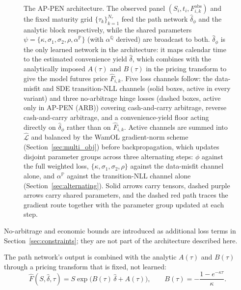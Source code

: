 \documentclass[11pt, a4paper]{article}
\begin{document}
\begin{figure}[h!]
{%
}
\caption{The AP-PEN architecture. The observed panel $(S_i, t_i, F^{\mathrm{obs}}_{i,k})$
and the fixed maturity grid $\{\tau_k\}_{k=1}^{N_\tau}$ feed the path network
$\hat{\delta}_\phi$ and the analytic block respectively, while the shared
parameters $\psi = \{\kappa, \sigma_1, \sigma_2, \rho, \alpha^{\mathbb{P}}\}$
(with $\alpha^{\mathbb{Q}}$ derived) are broadcast to both. $\hat{\delta}_\phi$
is the only learned network in the architecture: it maps calendar time to the
estimated convenience yield $\hat{\delta}$, which combines with the
analytically imposed $A(\tau)$ and $B(\tau)$ in the pricing transform to give
the model futures price $\hat{F}_{i,k}$. Five loss channels follow: the
data-misfit and SDE transition-NLL channels (solid boxes, active in every
variant) and three no-arbitrage hinge losses (dashed boxes, active only in
AP-PEN (ARB)) covering cash-and-carry arbitrage, reverse cash-and-carry
arbitrage, and a convenience-yield floor acting directly on $\hat{\delta}_\phi$
rather than on $\hat{F}_{i,k}$. Active channels are summed into
$\hat{\mathcal{L}}$ and balanced by the WamOL gradient-norm scheme
(Section~\ref{sec:multi_obj}) before backpropagation, which updates disjoint
parameter groups across three alternating steps: $\phi$ against the full
weighted loss, $\{\kappa, \sigma_1, \sigma_2, \rho\}$ against the data-misfit
channel alone, and $\alpha^{\mathbb{P}}$ against the transition-NLL channel
alone (Section~\ref{sec:alternating}). Solid arrows carry tensors, dashed
purple arrows carry shared parameters, and the dashed red path traces the
gradient route together with the parameter group updated at each step.}
\label{fig:appinn}
\end{figure}

No-arbitrage and economic bounds are introduced as
additional loss terms in Section~\ref{sec:constraints}; they are not
part of the architecture described here.

The path network's output is combined with the analytic $A(\tau)$ and
$B(\tau)$ through a pricing transform that is fixed, not learned:
\begin{equation}
    \label{eq:pricing_transform}
    \hat{F}(S, \hat{\delta}, \tau) = S \exp\!\big(B(\tau)\,\hat{\delta} +
    A(\tau)\big), \qquad
    B(\tau) = -\frac{1-e^{-\kappa\tau}}{\kappa}.
\end{equation}
\end{document}
